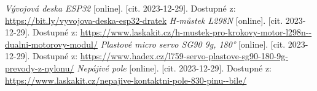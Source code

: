 \documentclass[12pt, a4paper,
oneside
openany
]{report}
\begin{document}
	\begin{thebibliography}{99}
		 \textit{Vývojová deska ESP32} [online]. [cit. 2023-12-29]. Dostupné z: \url{https://bit.ly/vyvojova-deska-esp32-dratek}
		\textit{H-můstek L298N} [online]. [cit. 2023-12-29]. Dostupné z: \url{https://www.laskakit.cz/h-mustek-pro-krokovy-motor-l298n--dualni-motorovy-modul/}
        \textit{Plastové micro servo SG90 9g, 180°} [online]. [cit. 2023-12-29]. Dostupné z: \url{https://www.hadex.cz/l759-servo-plastove-sg90-180-9g-prevody-z-nylonu/}
        \textit{Nepájivé pole} [online]. [cit. 2023-12-29]. Dostupné z: \url{https://www.laskakit.cz/nepajive-kontaktni-pole-830-pinu--bile/}
	\end{thebibliography}
	
	\listoffigures
	
	
	[\vspace{-22pt}] %
\end{document}
